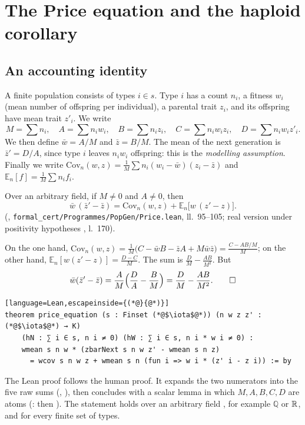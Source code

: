 \section{The Price equation and the haploid corollary}\label{ch4:sec:price}

\subsection{An accounting identity}
A finite population consists of types $i\in s$. Type $i$ has a count $n_i$, a fitness $w_i$
(mean number of offspring per individual), a parental trait $z_i$, and its offspring have mean trait
$z'_i$. We write
\[
M=\sum n_i,\quad A=\sum n_iw_i,\quad B=\sum n_iz_i,\quad C=\sum n_iw_iz_i,\quad D=\sum n_iw_iz'_i .
\]
We then define $\bar w=A/M$ and $\bar z=B/M$. The mean of the next generation is $\bar z'=D/A$, since
type $i$ leaves $n_iw_i$ offspring: this is the \emph{modelling assumption}. Finally we write
$\mathrm{Cov}_n(w,z)=\frac1M\sum n_i(w_i-\bar w)(z_i-\bar z)$ and $\mathbb E_n[f]=\frac1M\sum n_if_i$.

\begin{theorem}\label{ch4:thm:price}
Over an arbitrary field, if $M\ne0$ and $A\ne0$, then
\[
\bar w\,(\bar z'-\bar z)=\mathrm{Cov}_n(w,z)+\mathbb E_n\bigl[w\,(z'-z)\bigr].
\]
\tierA{} (, \texttt{formal\_cert/Programmes/PopGen/Price.lean}, ll.~95--105; real version
under positivity hypotheses , l.~170).
\end{theorem}

\begin{humanproof}
On the one hand, $\mathrm{Cov}_n(w,z)=\frac1M\bigl(C-\bar wB-\bar zA+M\bar w\bar z\bigr)=\frac{C-AB/M}{M}$; on the other
hand, $\mathbb E_n[w(z'-z)]=\frac{D-C}{M}$. The sum is $\frac DM-\frac{AB}{M^2}$. But
\[
\bar w(\bar z'-\bar z)=\frac AM\Bigl(\frac DA-\frac BM\Bigr)=\frac DM-\frac{AB}{M^2}. \qedhere
\]
\end{humanproof}

\begin{leanbox}
\begin{lstlisting}[language=Lean,escapeinside={(*@}{@*)}]
theorem price_equation (s : Finset (*@$\iota$@*)) (n w z z' : (*@$\iota$@*) → K)
    (hN : ∑ i ∈ s, n i ≠ 0) (hW : ∑ i ∈ s, n i * w i ≠ 0) :
    wmean s n w * (zbarNext s n w z' - wmean s n z)
      = wcov s n w z + wmean s n (fun i => w i * (z' i - z i)) := by
\end{lstlisting}
The Lean proof follows the human proof. It expands the two numerators into the five raw sums
(, ), then concludes with a scalar lemma in which $M,A,B,C,D$ are
atoms (:  then ). The statement holds over an arbitrary field ,
for example $\mathbb Q$ or $\mathbb{R}$, and for every finite set of types.
\end{leanbox}

